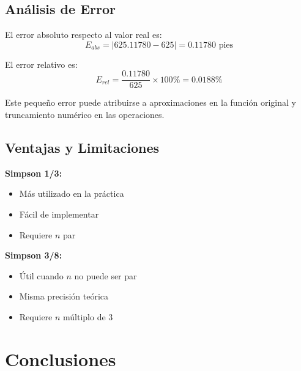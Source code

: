 \documentclass[conference]{IEEEtran}
\begin{document}
\subsection{Análisis de Error}

El error absoluto respecto al valor real es:
\begin{equation}
E_{abs} = |625.11780 - 625| = 0.11780 \text{ pies}
\end{equation}

El error relativo es:
\begin{equation}
E_{rel} = \frac{0.11780}{625} \times 100\% = 0.0188\%
\end{equation}

Este pequeño error puede atribuirse a aproximaciones en la función original y truncamiento numérico en las operaciones.

\subsection{Ventajas y Limitaciones}

\textbf{Simpson 1/3:}
\begin{itemize}
    \item Más utilizado en la práctica
    \item Fácil de implementar
    \item Requiere $n$ par
\end{itemize}

\textbf{Simpson 3/8:}
\begin{itemize}
    \item Útil cuando $n$ no puede ser par
    \item Misma precisión teórica
    \item Requiere $n$ múltiplo de 3
\end{itemize}

\section{Conclusiones}
\end{document}
